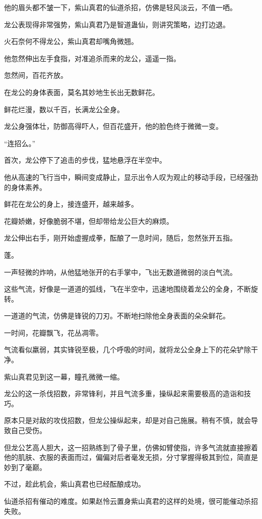 \begin{this_body}
他的眉头都不皱一下，紫山真君的仙道杀招，仿佛是轻风淡云，不值一哂。

龙公表现得非常强势，紫山真君乃是智道蛊仙，则讲究策略，边打边退。

火石奈何不得龙公，紫山真君却嘴角微翘。

他忽然伸出左手食指，对准追杀而来的龙公，遥遥一指。

忽然间，百花齐放。

在龙公的身体表面，莫名其妙地生长出无数鲜花。

鲜花烂漫，数以千百，长满龙公全身。

龙公身强体壮，防御高得吓人，但百花盛开，他的脸色终于微微一变。

“连招么。”

首次，龙公停下了追击的步伐，猛地悬浮在半空中。

他从高速的飞行当中，瞬间变成静止，显示出令人叹为观止的移动手段，已经强劲的身体素养。

鲜花在龙公的身上，接连盛开，越来越多。

花瓣娇嫩，好像脆弱不堪，但却带给龙公巨大的麻烦。

龙公伸出右手，刚开始虚握成拳，酝酿了一息时间，随后，忽然张开五指。

蓬。

一声轻微的炸响，从他猛地张开的右手掌中，飞出无数道微弱的淡白气流。

这些气流，好像是一道道的弧线，飞在半空中，迅速地围绕着龙公的全身，不断旋转。

一道道的气流，仿佛是锋锐的刀刃。不断地扫除他全身表面的朵朵鲜花。

一时间，花瓣飘飞，花丛凋零。

气流看似羸弱，其实锋锐至极，几个呼吸的时间，就将龙公全身上下的花朵铲除干净。

紫山真君见到这一幕，瞳孔微微一缩。

龙公的这一杀伐招数，非常锋利，并且气流多重，操纵起来需要极高的造诣和技巧。

原本只是对敌的攻伐招数，但龙公操纵起来，却是对自己施展。稍有不慎，就会导致自己受伤。

但龙公艺高人胆大，这一招熟练到了骨子里，仿佛如臂使指，许多气流就直接擦着他的肌肤、衣服的表面而过，偏偏对后者毫发无损，分寸掌握得极其到位，简直是妙到了毫巅。

不过，趁此机会，紫山真君也已经酝酿成功。

仙道杀招有催动的难度。如果赵怜云置身紫山真君的这样的处境，很可能催动杀招失败。


\end{this_body}
